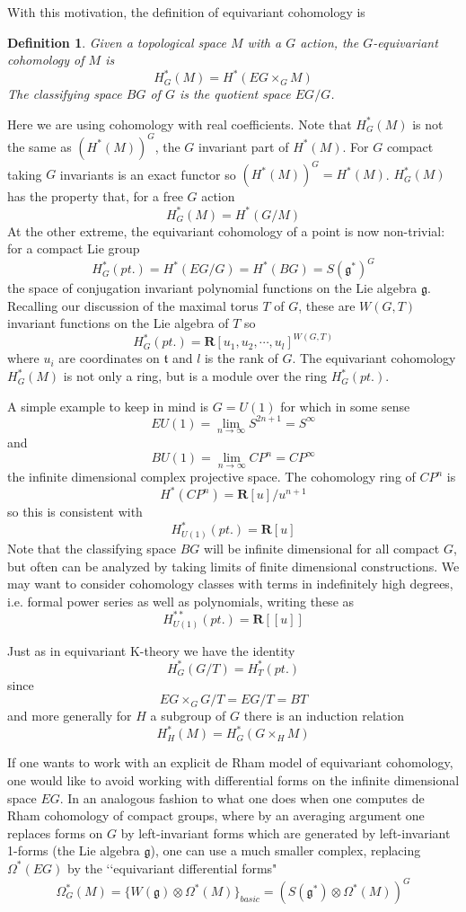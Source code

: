 \documentclass[a4paper,a4paper]{article}
\newtheorem{define}{Definition}
\theoremstyle{conjecture}
\begin{document}
With this motivation, the definition of equivariant cohomology is

\begin{define}
Given a topological space $M$ with a $G$ action, the $G$-equivariant
cohomology of $M$ is
$$H^*_G(M)=H^*(EG\times_G M)$$
The classifying space $BG$ of $G$ is the quotient space $EG/G$.
\end{define}

Here we are using cohomology with real coefficients.
Note that $H^*_G(M)$ is not the same as $(H^*(M))^G$, the $G$ invariant part of $H^*(M)$.
For $G$ compact taking $G$ invariants is an exact functor so $(H^*(M))^G=H^*(M)$.  $H^*_G(M)$ has the
property that, for a free $G$ action
$$H^*_G(M)=H^*(G/M)$$
At the other extreme, the equivariant cohomology of a point is now non-trivial: for
a compact Lie group 
$$H^*_G(pt.)=H^*(EG/G)=H^*(BG)=S(\mathfrak g^*)^G$$
the space of conjugation invariant polynomial functions on the Lie algebra
$\mathfrak g$.  Recalling our discussion of the maximal torus $T$ of $G$, these
are $W(G,T)$ invariant functions on the Lie algebra of $T$ so
$$H^*_G(pt.)={\mathbf R}[u_1,u_2,\cdots,u_l]^{W(G,T)}$$
where $u_i$ are coordinates on $\mathfrak t$ and $l$ is the rank of $G$.  The
equivariant cohomology $H^*_G(M)$ is not only a ring, but is a module over the
ring $H^*_G(pt.)$.

A simple example to keep in mind is $G=U(1)$ for which in some sense
$$EU(1)=\lim_{n\rightarrow\infty}S^{2n+1}=S^\infty$$
and 
$$BU(1)=\lim_{n\rightarrow\infty}CP^{n}=CP^\infty$$
the infinite dimensional complex projective space. The cohomology ring of
$CP^n$ is 
$$H^*(CP^n)={\mathbf R}[u]/u^{n+1}$$
so this is consistent with
$$H^*_{U(1)}(pt.)={\mathbf R}[u]$$
Note that the
classifying space $BG$ will be infinite dimensional for all compact $G$, but
often can be analyzed by taking limits of finite dimensional constructions.
We may want to consider cohomology classes with terms in indefinitely high
degrees, i.e. formal power series as well as polynomials, writing these as
$$H^{**}_{U(1)}(pt.)={\mathbf R}[[u]]$$

Just as in equivariant K-theory we have the identity
$$H^*_G(G/T)=H^*_T(pt.)$$
since
$$EG\times_G G/T=EG/T=BT$$
and more generally for $H$ a subgroup of $G$ there is an induction relation
$$H^*_H(M)=H^*_G(G\times_H M)$$

If one wants to work with an explicit de Rham model of equivariant cohomology,
one would like to avoid working with differential forms on the infinite 
dimensional space $EG$.  In an analogous
fashion to what one does when one computes de Rham cohomology of
compact groups, where by an averaging argument one replaces forms
on $G$ by left-invariant forms which are generated by
left-invariant 1-forms (the Lie algebra $\mathfrak g$), one can use a much smaller
complex, replacing $\Omega^*(EG)$ by the \lq\lq equivariant differential
forms"
$$\Omega_G^*(M)=\{W(\mathfrak g)\otimes \Omega^*(M)\}_{basic}=
(S({\mathfrak g}^*)\otimes \Omega^*(M))^G$$
\end{document}
